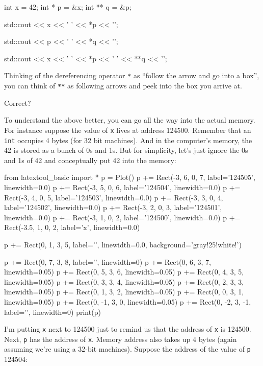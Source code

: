 \begin{consolethree}[escapeinside=||]
int x = 42;
int * p = &x;
int ** q = &p;

std::cout << x << ' ' << *p << '\n';

std::cout << p << ' ' << *q << '\n';

std::cout << x << ' ' << *p << ' '
          << **q << '\n';
\end{consolethree}
Thinking of the dereferencing operator \texttt{*} as ``follow the arrow and go into a box'', you can think of \texttt{**} as following  arrows and peek into the box you arrive at.

Correct?

To understand the above better, you can go all the way into the actual memory. For instance suppose the value of \texttt{x} lives at address 124500. Remember that an \texttt{int} occupies 4 bytes (for 32 bit machines). And in the computer's memory, the 42 is stored as a bunch of 0s and 1s. But for simplicity, let's just ignore the 0s and 1s of 42 and conceptually put 42 into the memory:

\begin{python}
from latextool_basic import *
p = Plot()
p += Rect(-3, 6, 0, 7, label='124505', linewidth=0.0)
p += Rect(-3, 5, 0, 6, label='124504', linewidth=0.0)
p += Rect(-3, 4, 0, 5, label='124503', linewidth=0.0)
p += Rect(-3, 3, 0, 4, label='124502', linewidth=0.0)
p += Rect(-3, 2, 0, 3, label='124501', linewidth=0.0)
p += Rect(-3, 1, 0, 2, label='124500', linewidth=0.0)
p += Rect(-3.5, 1, 0, 2, label='x', linewidth=0.0)

p += Rect(0, 1, 3, 5, label='', linewidth=0.0, background='gray!25!white!')

p += Rect(0, 7, 3, 8, label='', linewidth=0)
p += Rect(0, 6, 3, 7, linewidth=0.05)
p += Rect(0, 5, 3, 6, linewidth=0.05)
p += Rect(0, 4, 3, 5, linewidth=0.05)
p += Rect(0, 3, 3, 4, linewidth=0.05)
p += Rect(0, 2, 3, 3, linewidth=0.05)
p += Rect(0, 1, 3, 2, linewidth=0.05)
p += Rect(0, 0, 3, 1, linewidth=0.05)
p += Rect(0, -1, 3, 0, linewidth=0.05)
p += Rect(0, -2, 3, -1, label='', linewidth=0)
print(p)
\end{python}


I'm putting \texttt{x} next to 124500 just to remind us that the address of \texttt{x} is 124500. Next, \texttt{p} has the address of \texttt{x}.
Memory address also takes up 4 bytes (again assuming we're using a 32-bit machines). Suppose the address of the value of \texttt{p} 124504:

